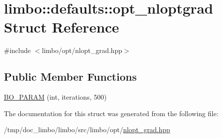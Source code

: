 \hypertarget{structlimbo_1_1defaults_1_1opt__nloptgrad}{}\section{limbo\+:\+:defaults\+:\+:opt\+\_\+nloptgrad Struct Reference}
\label{structlimbo_1_1defaults_1_1opt__nloptgrad}


{\ttfamily \#include $<$limbo/opt/nlopt\+\_\+grad.\+hpp$>$}

\subsection*{Public Member Functions}
\begin{DoxyCompactItemize}
\item 
\hyperlink{group__opt__defaults_ga4b0e251e3b7440148225201bcfc61f26}{B\+O\+\_\+\+P\+A\+R\+AM} (int, iterations, 500)
\end{DoxyCompactItemize}


The documentation for this struct was generated from the following file\+:\begin{DoxyCompactItemize}
\item 
/tmp/doc\+\_\+limbo/limbo/src/limbo/opt/\hyperlink{nlopt__grad_8hpp}{nlopt\+\_\+grad.\+hpp}\end{DoxyCompactItemize}
